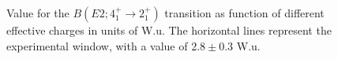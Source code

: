 \begin{figure}
\caption{Value for the $B(E2;4_1^+\rightarrow 2_1^+)$ transition as function of
         different effective charges in units of W.u. The horizontal
         lines represent the experimental window, with a value of 
         $2.8 \pm 0.3$ W.u.}
\label{fig:empe2}
\end{figure}























                           





